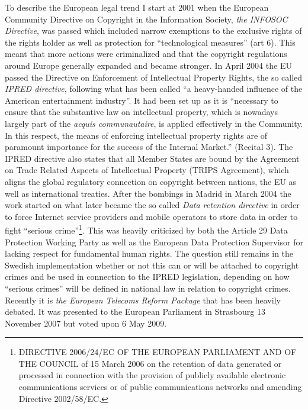 To describe the European legal trend I start at 2001 when the European Community
Directive on Copyright in the Information Society, \textit{the INFOSOC
Directive}, was passed which included narrow exemptions to the exclusive rights
of the rights holder as well as protection for ``technological measures'' (art
6). This meant that more actions were criminalized and that the copyright
regulations around Europe generally expanded and became stronger. In April 2004
the EU passed the Directive on Enforcement of Intellectual Property Rights, the
so called \textit{IPRED directive}, following what has been called ``a
heavy-handed inf\hbox{}luence of the American entertainment
industry''\cite{darling-kierkegaard05}. It had been set up as it is ``necessary
to ensure that the substantive law on intellectual property, which is nowadays
largely part of the \textit{acquis communautaire}, is applied ef\hbox{}fectively in the
Community. In this respect, the means of enforcing intellectual property rights
are of paramount importance for the success of the Internal Market.'' (Recital
3). The IPRED directive also states that all Member States are bound by the
Agreement on Trade Related Aspects of Intellectual Property (TRIPS Agreement),
which aligns the global regulatory connection on copyright between nations, the
EU as well as international treaties. After the bombings in Madrid in March 2004
the work started on what later became the so called \textit{Data retention
directive} in order to force Internet service providers and mobile operators to
store data in order to f\hbox{}ight ``serious crime''\footnote{DIRECTIVE 2006/24/EC OF
THE EUROPEAN PARLIAMENT AND OF THE COUNCIL of 15 March 2006 on the retention of
data generated or processed in connection with the provision of publicly
available electronic communications services or of public communications
networks and amending Directive 2002/58/EC.}. This was heavily criticized by
both the Article 29 Data Protection Working Party as well as the European Data
Protection Supervisor for lacking respect for fundamental human rights. The
question still remains in the Swedish implementation whether or not this can or
will be attached to copyright crimes and be used in connection to the IPRED
legislation, depending on how ``serious crimes'' will be def\hbox{}ined in national law
in relation to copyright crimes. Recently it is \textit{the European Telecoms
Reform Package} that has been heavily debated. It was presented to the European
Parliament in Strasbourg 13 November 2007 but voted upon 6 May 2009.

